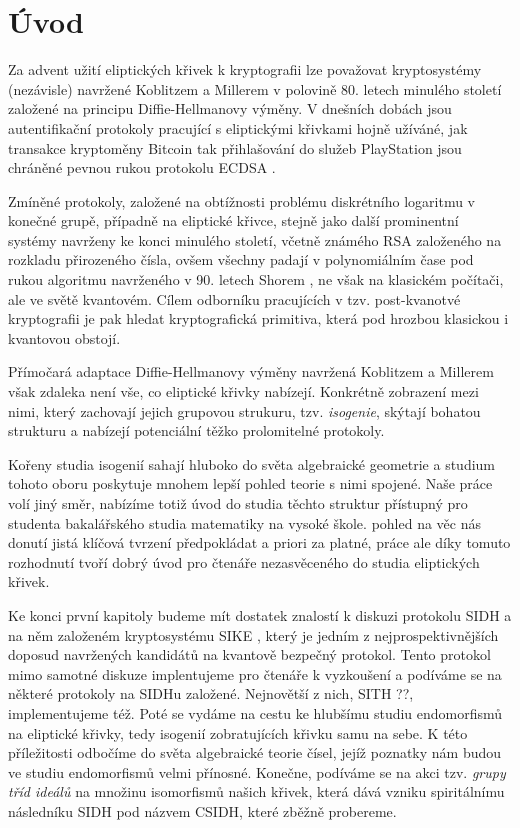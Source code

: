 \documentclass[12pt]{report}
\begin{document}
{
\hypersetup{linkcolor=black}
\tableofcontents
}
\thispagestyle{empty}

\chapter*{Úvod}

Za advent užití eliptických křivek k kryptografii lze považovat kryptosystémy (nezávisle) navržené Koblitzem \cite{Koblitz} a Millerem \cite{Miller} v polovině 80. letech minulého století založené na principu Diffie-Hellmanovy \cite{Diffie} výměny. V dnešních dobách jsou autentifikační protokoly pracující s eliptickými křivkami hojně užíváné, jak transakce kryptoměny Bitcoin tak přihlašování do služeb PlayStation jsou chráněné pevnou rukou protokolu ECDSA \cite{ECDSA}.

Zmíněné protokoly, založené na obtížnosti problému diskrétního logaritmu v konečné grupě, případně na eliptické křivce, stejně jako další prominentní systémy navrženy ke konci minulého století, včetně  známého RSA \cite{RSA} založeného na rozkladu přirozeného čísla, ovšem všechny padají v polynomiálním čase pod rukou algoritmu navrženého v 90. letech Shorem \cite{Shor}, ne však na klasickém počítači, ale ve světě kvantovém. Cílem odborníku pracujících v tzv. post-kvanotvé kryptografii je pak hledat kryptografická primitiva, která pod hrozbou klasickou i kvantovou obstojí.

Přímočará adaptace Diffie-Hellmanovy výměny navržená Koblitzem a Millerem však zdaleka není vše, co eliptické křivky nabízejí. Konkrétně zobrazení mezi nimi, který zachovají jejich grupovou strukuru, tzv. \textit{isogenie}, skýtají bohatou strukturu a nabízejí potenciální těžko prolomitelné protokoly.

Kořeny studia isogenií sahají hluboko do světa algebraické geometrie a studium tohoto oboru poskytuje mnohem lepší pohled  teorie s nimi spojené. Naše práce volí jiný směr, nabízíme totiž úvod do studia těchto struktur přístupný pro studenta bakalářského studia matematiky na vysoké škole.   pohled na věc nás donutí jistá klíčová tvrzení předpokládat a priori za platné, práce ale díky tomuto rozhodnutí tvoří dobrý úvod pro čtenáře nezasvěceného do studia eliptických křivek.

Ke konci první kapitoly budeme mít dostatek znalostí k diskuzi protokolu SIDH a na něm založeném kryptosystému SIKE \cite{DeFeo3}, který je jedním z nejprospektivnějších doposud navržených kandidátů na kvantově bezpečný protokol. Tento protokol mimo samotné diskuze implentujeme pro čtenáře k vyzkoušení a podíváme se na některé protokoly na SIDHu založené. Nejnovětší z nich, SITH ??, implementujeme též. Poté se vydáme na cestu ke hlubšímu studiu endomorfismů na eliptické křivky, tedy isogenií zobratujících křivku samu na sebe. K této příležitosti odbočíme do světa algebraické teorie čísel, jejíž poznatky nám budou ve studiu endomorfismů velmi přínosné. Konečne, podíváme se na akci tzv. \textit{grupy tříd ideálů} na množinu isomorfismů našich křivek, která dává vzniku spiritálnímu následníku SIDH pod názvem CSIDH, které zběžně probereme. 
\end{document}

